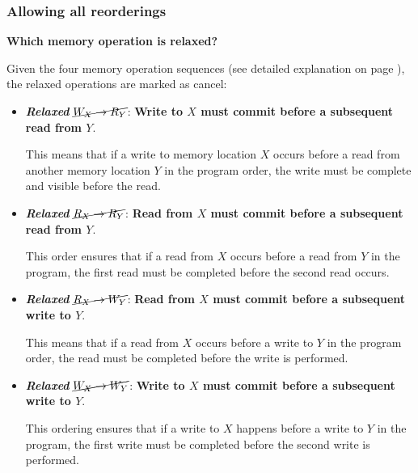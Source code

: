 \newpage

\subsubsection{Allowing all reorderings}

\begin{flushleft}
    \textcolor{Green3}{ \textbf{Which memory operation is relaxed?}}
\end{flushleft}
Given the four memory operation sequences (see detailed explanation on page ), the relaxed operations are marked as cancel:
\begin{itemize}
    \item[\textcolor{Green3}{\faIcon{check}}] \textcolor{Green3}{\textbf{\emph{Relaxed}} $\cancel{W_{X} \rightarrow R_{Y}}$}: \textbf{Write to $X$ must commit before a subsequent read from $Y$}.

    This means that if a write to memory location $X$ occurs before a read from another memory location $Y$ in the program order, the write must be complete and visible before the read.


    \item[\textcolor{Green3}{\faIcon{check}}] \textcolor{Green3}{\textbf{\emph{Relaxed}} $\cancel{R_{X} \rightarrow R_{Y}}$}: \textbf{Read from $X$ must commit before a subsequent read from $Y$}.

    This order ensures that if a read from $X$ occurs before a read from $Y$ in the program, the first read must be completed before the second read occurs.


    \item[\textcolor{Green3}{\faIcon{check}}] \textcolor{Green3}{\textbf{\emph{Relaxed}} $\cancel{R_{X} \rightarrow W_{Y}}$}: \textbf{Read from $X$ must commit before a subsequent write to $Y$}.

    This means that if a read from $X$ occurs before a write to $Y$ in the program order, the read must be completed before the write is performed.


    \item[\textcolor{Green3}{\faIcon{check}}] \textcolor{Green3}{\textbf{\emph{Relaxed}} $\cancel{W_{X} \rightarrow W_{Y}}$}: \textbf{Write to $X$ must commit before a subsequent write to $Y$}.

    This ordering ensures that if a write to $X$ happens before a write to $Y$ in the program, the first write must be completed before the second write is performed.
\end{itemize}

